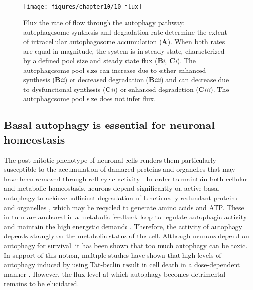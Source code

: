 \begin{figure}[h!]
  \center
  \texttt{[image: figures/chapter10/10\_flux]}
  \caption[Flux the rate of flow through the autophagy pathway]{Flux the rate of flow through the autophagy pathway: autophagosome synthesis and degradation rate determine the extent of intracellular autophagosome accumulation (\textbf{A}). When both rates are equal in magnitude, the system is in steady state, characterized by a defined pool size and steady state flux (\textbf{B}\textit{i}, \textbf{C}\textit{i}). The autophagosome pool size can increase due to either enhanced synthesis (\textbf{B}\textit{ii}) or decreased degradation (\textbf{B}\textit{iii}) and can decrease due to dysfunctional synthesis (\textbf{C}\textit{ii}) or enhanced degradation (\textbf{C}\textit{iii}). The autophagosome pool size does not infer flux. }
  \label{fig:10_flux}
\end{figure}

\subsection{Basal autophagy is essential for neuronal homeostasis}
The post-mitotic phenotype of neuronal cells renders them particularly susceptible to the accumulation of damaged proteins and organelles that may have been removed through cell cycle activity \citep{Liang2014,Tan2014}. In order to maintain both cellular and metabolic homeostasis, neurons depend significantly on active basal autophagy to achieve sufficient degradation of functionally redundant proteins and organelles \citep{Meijer2009}, which may be recycled to generate amino acids and ATP. These in turn are anchored in a metabolic feedback loop to regulate autophagic activity and maintain the high energetic demands \citep{Loos2013}. Therefore, the activity of autophagy depends strongly on the metabolic status of the cell. Although neurons depend on autophagy for survival, it has been shown that too much autophagy can be toxic. In support of this notion, multiple studies have shown that high levels of autophagy induced by using Tat-beclin result in cell death in a dose-dependent manner \citep{Liu2013,Liu2015}. However, the flux level at which autophagy becomes detrimental remains to be elucidated. 

